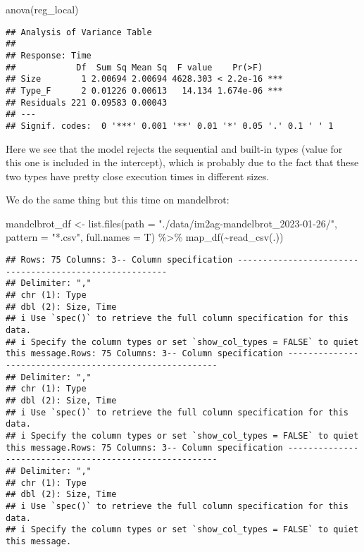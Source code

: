 \documentclass[
]{article}
\newenvironment{Shaded}{\begin{snugshade}}{\end{snugshade}}
\newcommand{\AttributeTok}[1]{\textcolor[rgb]{0.77,0.63,0.00}{#1}}
\newcommand{\FunctionTok}[1]{\textcolor[rgb]{0.00,0.00,0.00}{#1}}
\newcommand{\NormalTok}[1]{#1}
\newcommand{\OtherTok}[1]{\textcolor[rgb]{0.56,0.35,0.01}{#1}}
\newcommand{\SpecialCharTok}[1]{\textcolor[rgb]{0.00,0.00,0.00}{#1}}
\newcommand{\StringTok}[1]{\textcolor[rgb]{0.31,0.60,0.02}{#1}}
\begin{document}
\begin{Shaded}
\begin{Highlighting}[]
\FunctionTok{anova}\NormalTok{(reg\_local)}
\end{Highlighting}
\end{Shaded}

\begin{verbatim}
## Analysis of Variance Table
## 
## Response: Time
##            Df  Sum Sq Mean Sq  F value    Pr(>F)    
## Size        1 2.00694 2.00694 4628.303 < 2.2e-16 ***
## Type_F      2 0.01226 0.00613   14.134 1.674e-06 ***
## Residuals 221 0.09583 0.00043                       
## ---
## Signif. codes:  0 '***' 0.001 '**' 0.01 '*' 0.05 '.' 0.1 ' ' 1
\end{verbatim}

Here we see that the model rejects the sequential and built-in types
(value for this one is included in the intercept), which is probably due
to the fact that these two types have pretty close execution times in
different sizes.

We do the same thing but this time on mandelbrot:

\begin{Shaded}
\begin{Highlighting}[]
\NormalTok{mandelbrot\_df }\OtherTok{\textless{}{-}} \FunctionTok{list.files}\NormalTok{(}\AttributeTok{path =} \StringTok{"./data/im2ag{-}mandelbrot\_2023{-}01{-}26/"}\NormalTok{, }\AttributeTok{pattern =} \StringTok{"*.csv"}\NormalTok{, }\AttributeTok{full.names =}\NormalTok{ T) }\SpecialCharTok{\%\textgreater{}\%} \FunctionTok{map\_df}\NormalTok{(}\SpecialCharTok{\textasciitilde{}}\FunctionTok{read\_csv}\NormalTok{(.)) }
\end{Highlighting}
\end{Shaded}

\begin{verbatim}
## Rows: 75 Columns: 3-- Column specification --------------------------------------------------------
## Delimiter: ","
## chr (1): Type
## dbl (2): Size, Time
## i Use `spec()` to retrieve the full column specification for this data.
## i Specify the column types or set `show_col_types = FALSE` to quiet this message.Rows: 75 Columns: 3-- Column specification --------------------------------------------------------
## Delimiter: ","
## chr (1): Type
## dbl (2): Size, Time
## i Use `spec()` to retrieve the full column specification for this data.
## i Specify the column types or set `show_col_types = FALSE` to quiet this message.Rows: 75 Columns: 3-- Column specification --------------------------------------------------------
## Delimiter: ","
## chr (1): Type
## dbl (2): Size, Time
## i Use `spec()` to retrieve the full column specification for this data.
## i Specify the column types or set `show_col_types = FALSE` to quiet this message.
\end{verbatim}
\end{document}
